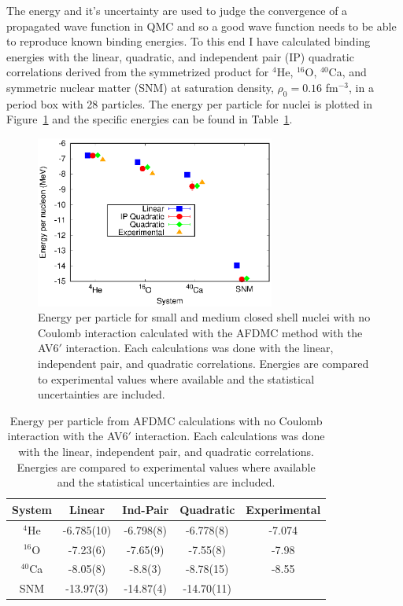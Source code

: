 The energy and it's uncertainty are used to judge the convergence of a propagated wave function in QMC and so a good wave function needs to be able to reproduce known binding energies. To this end I have calculated binding energies with the linear, quadratic, and independent pair (IP) quadratic correlations derived from the symmetrized product for $^4$He, $^{16}$O, $^{40}$Ca, and symmetric nuclear matter (SNM) at saturation density, $\rho_0=0.16$ fm$^{-3}$, in a period box with 28 particles. The energy per particle for nuclei is plotted in Figure~\ref{fig:energies} and the specific energies can be found in Table~\ref{tab:energies}.
\begin{figure}[h!]
   \centering
   \includegraphics[width=0.7\textwidth]{figures/energy.eps}
   \caption{Energy per particle for small and medium closed shell nuclei with no Coulomb interaction calculated with the AFDMC method with the AV6$'$ interaction. Each calculations was done with the linear, independent pair, and quadratic correlations. Energies are compared to experimental values where available and the statistical uncertainties are included.}
   \label{fig:energies}
\end{figure}
\begin{table}[htb]
   \centering
   \begin{tabular}{ccccc}
      \hline\hline
      System & Linear & Ind-Pair & Quadratic & Experimental \\
      \hline
      $^4${He}    & -6.785(10)   & -6.798(8) & -6.778(8)    & -7.074 \\   
      $^{16}${O}  & -7.23(6)     & -7.65(9)  & -7.55(8)     & -7.98  \\   
      $^{40}${Ca} & -8.05(8)     & -8.8(3)   & -8.78(15)    & -8.55  \\
      SNM         & -13.97(3)    & -14.87(4) & -14.70(11)   &        \\
      \hline\hline
   \end{tabular}
   \caption{Energy per particle from AFDMC calculations with no Coulomb interaction with the AV6$'$ interaction. Each calculations was done with the linear, independent pair, and quadratic correlations. Energies are compared to experimental values where available and the statistical uncertainties are included.}
   \label{tab:energies}
\end{table}
